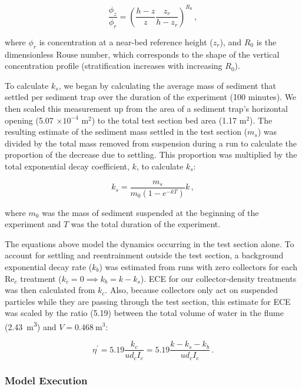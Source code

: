 \documentclass[geosciences,article,submit,moreauthors,pdftex]{Definitions/mdpi}
\newcommand\Rey{\mathrm{Re}}
\begin{document}
\begin{equation}
    \frac{\phi_z}{\phi_r} = \left( \frac{h - z}{z} \frac{z_r}{h - z_r} \right)^{R_0}\,,
    \label{eq:rouse}    
\end{equation}

\noindent where $\phi_r$ is concentration at a near-bed reference height ($z_r$), and $R_0$ is the dimensionless Rouse number, which corresponds to the shape of the vertical concentration profile (stratification increases with increasing $R_0$).

To calculate $k_s$, we began by calculating the average mass of sediment that settled per sediment trap over the duration of the experiment (100 minutes). We then scaled this measurement up from the area of a sediment trap's horizontal opening (5.07 $\times 10^{-4}$ m$^2$) to the total test section bed area (1.17 m$^2$). The resulting estimate of the sediment mass settled in the test section ($m_s$) was divided by the total mass removed from suspension during a run to calculate the proportion of the decrease due to settling. This proportion was multiplied by the total exponential decay coefficient, $k$, to calculate $k_s$:

\begin{equation}
    k_s = \frac{m_s}{m_0(1-e^{-kT})}k\,,
    \label{eq:ks}
\end{equation}

\noindent where $m_0$ was the mass of sediment suspended at the beginning of the experiment and $T$ was the total duration of the experiment.

The equations above model the dynamics occurring in the test section alone. To account for settling and reentrainment outside the test section, a background exponential decay rate ($k_b$) was estimated from runs with zero collectors for each $\Rey_c$ treatment ($k_c = 0 \implies k_b = k - k_s$). ECE for our collector-density treatments was then calculated from $k_c$. Also, because collectors only act on suspended particles while they are passing through the test section, this estimate for ECE was scaled by the ratio (5.19) between the total volume of water in the flume (\SI{2.43}{\metre\cubed}) and $V = \SI{0.468}{\metre\cubed}$:

\begin{equation}
    \eta^\prime = 5.19\frac{k_c}{ud_cI_c} = 5.19\frac{k - k_s - k_b}{ud_cI_c}\,.
    \label{eq:eta}
\end{equation}

\subsubsection{Model Execution}
\end{document}
